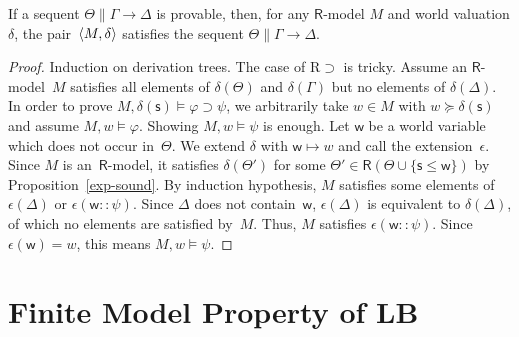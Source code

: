    \begin{lemma}
    \label{sound}
    If a sequent $\Theta\parallel \Gamma\longrightarrow \Delta$ is
    provable,
    then, for any $\mathsf R$-model $M$ and world valuation $\delta$,
    the pair~$\langle{M,\delta}\rangle$ satisfies the sequent $\Theta\parallel
    \Gamma\rightarrow\Delta$.
   \end{lemma}
   \begin{proof}
    Induction on derivation trees.
    The case of R$\supset$ is tricky.
    Assume an $\mathsf R$-model~$M$ satisfies all elements of
    $\delta(\Theta)$ and $\delta(\Gamma)$ but no elements of $\delta(\Delta)$.
    In order to prove $M,\delta(\mathsf s)\models\varphi\supset\psi$, we
    arbitrarily take $w\in M$ with $ w\succeq \delta(\mathsf s)$ and assume $M,
    w\models\varphi$.
    Showing $M,w\models\psi$ is enough.
    Let $\mathsf w$ be a world variable which does not occur in~$\Theta$.
    We extend $\delta$ with $\mathsf{w}\mapsto w$ and call the extension~$\epsilon$.
    Since $M$ is an~$\mathsf R$-model,
    it satisfies $\delta(\Theta')$ for some $\Theta'\in \mathsf R(\Theta\cup
    \{\mathsf s\le \mathsf w\})$ by Proposition~\ref{exp-sound}.
    By induction hypothesis, $M$ satisfies some elements of $\epsilon(\Delta)$ or
    $\epsilon(\mathsf w::\psi)$. Since $\Delta$ does not contain~$\mathsf w$,
    $\epsilon(\Delta)$ is equivalent to $\delta(\Delta)$, of which no elements are
    satisfied by~$M$.
    Thus, $M$ satisfies $\epsilon(\mathsf w::\psi)$.
    Since $\epsilon(\mathsf w) = w$, this means $M,  w\models\psi$.
   \end{proof}

  \section{Finite Model Property of LB}
  \label{fmplb}


